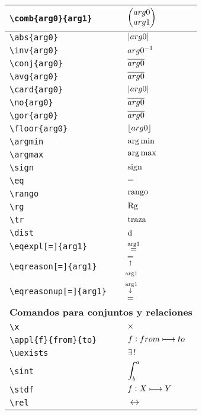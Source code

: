 \begin{longtable}{|p{3.5cm}|p{2cm}|}
\verb|\comb{arg0}{arg1}| & $\displaystyle\left( \begin{matrix} arg0 \\ arg1 \end{matrix} \right)$ \\ \midrule 
\verb|\abs{arg0}| & $\displaystyle\left\vert arg0 \right\vert$ \\ \midrule 
\verb|\inv{arg0}| & $\displaystyle{arg0}^{-1}$ \\ \midrule 
\verb|\conj{arg0}| & $\displaystyle\overline{arg0}$ \\ \midrule 
\verb|\avg{arg0}| & $\displaystyle\overline{arg0}$ \\ \midrule 
\verb|\card{arg0}| & $\displaystyle\left\vert arg0 \right\vert$ \\ \midrule 
\verb|\no{arg0}| & $\displaystyle\overline{arg0}$ \\ \midrule 
\verb|\gor{arg0}| & $\displaystyle\overline{arg0}$ \\ \midrule 
\verb|\floor{arg0}| & $\displaystyle\left\lfloor arg0 \right\rfloor$ \\ \midrule 
\verb|\argmin| & $\displaystyle\operatorname*{arg\,min}$ \\ \midrule 
\verb|\argmax| & $\displaystyle\operatorname*{arg\,max}$ \\ \midrule 
\verb|\sign| & $\displaystyle\operatorname{sign}$ \\ \midrule 
\verb|\eq| & $\displaystyle=$ \\ \midrule 
\verb|\rango| & $\displaystyle\operatorname{rango}$ \\ \midrule 
\verb|\rg| & $\displaystyle\operatorname{Rg}$ \\ \midrule 
\verb|\tr| & $\displaystyle\operatorname{traza}$ \\ \midrule 
\verb|\dist| & $\displaystyle\operatorname{d}$ \\ \midrule 
\verb|\eqexpl[=]{arg1}| & $\displaystyle\eqexpl[=]{arg1}$ \\ \midrule 
\verb|\eqreason[=]{arg1}| & $\displaystyle\eqreason[=]{arg1}$ \\ \midrule 
\verb|\eqreasonup[=]{arg1}| & $\displaystyle\eqreasonup[=]{arg1}$ \\ \midrule 
\bottomrule \multicolumn{2}{|p{5.5cm}|}{\textbf{Comandos para conjuntos y relaciones}} \\ \toprule 
\verb|\x| & $\displaystyle\times$ \\ \midrule 
\verb|\appl{f}{from}{to}| & $\displaystyle f : from\longmapsto to$ \\ \midrule 
\verb|\uexists| & $\displaystyle\exists\, !\;$ \\ \midrule 
\verb|\sint| & $\displaystyle\int_b^a\;$ \\ \midrule 
\verb|\stdf| & $\displaystyle f : X\longmapsto Y$ \\ \midrule 
\verb|\rel| & $\displaystyle\rel$ \\ \midrule 

\end{longtable}
